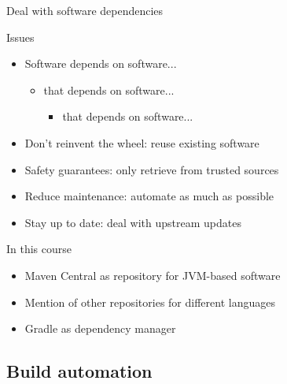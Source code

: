 \documentclass[presentation]{beamer}
\begin{document}
\begin{frame}{Deal with software dependencies}
    \begin{block}{Issues}
        \begin{itemize}
            \item Software depends on software...
            \begin{itemize}
                \item that depends on software...
                \begin{itemize}
                    \item that depends on software...
                \end{itemize}
            \end{itemize}
            \item Don't reinvent the wheel: reuse existing software
            \item Safety guarantees: only retrieve from trusted sources 
            \item Reduce maintenance: automate as much as possible
            \item Stay up to date: deal with upstream updates
        \end{itemize}
    \end{block}
    \begin{block}{In this course}
        \begin{itemize}
            \item Maven Central as repository for JVM-based software
            \item Mention of other repositories for different languages
            \item Gradle as dependency manager
        \end{itemize}
    \end{block}
\end{frame}

\subsection{Build automation}
\end{document}
